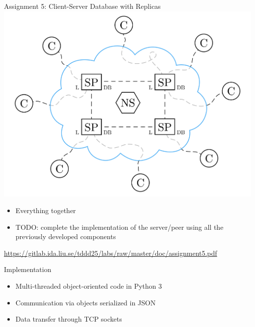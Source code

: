 \documentclass[compress,xcolor=table]{beamer}
\begin{document}
\begin{frame}{Assignment 5: Client-Server Database with Replicas}
  \centering
  \includegraphics[scale=0.10,page=1]{include/assets/distributed-database}
  \begin{itemize}
    \item Everything together
    \item \alert{TODO}: complete the implementation of the server/peer using all the previously developed components
  \end{itemize}
  \begin{center}
    \scriptsize \url{https://gitlab.ida.liu.se/tddd25/labs/raw/master/doc/assignment5.pdf}
  \end{center}
\end{frame}

\begin{frame}{Implementation}
  \begin{itemize}
    \item Multi-threaded object-oriented code in Python 3
    \item Communication via objects serialized in JSON
    \item Data transfer through TCP sockets
  \end{itemize}
\end{frame}
\end{document}
